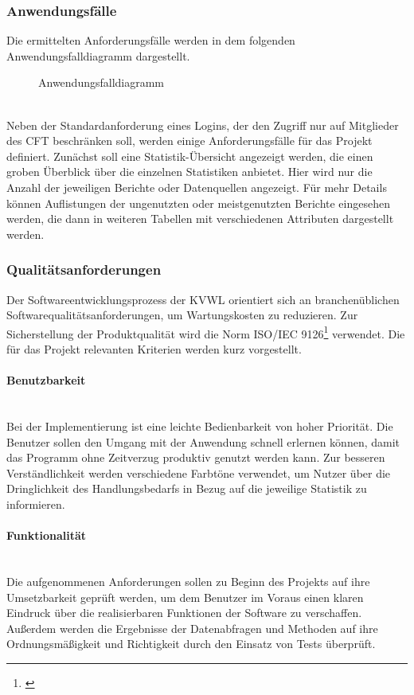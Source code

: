 \subsubsection{Anwendungsfälle}
\label{sec:Anwendungsfaelle}
Die ermittelten Anforderungsfälle werden in dem folgenden Anwendungsfalldiagramm dargestellt.
\begin{figure}[htb]
	\centering
	\caption{Anwendungsfalldiagramm}
	\label{fig:Anwendungsfalldiagramm}
\end{figure}\\
Neben der Standardanforderung eines Logins, der den Zugriff nur auf Mitglieder des \ac{CFT} \teamName beschränken soll, werden einige Anforderungsfälle für das Projekt definiert. Zunächst soll eine Statistik-Übersicht angezeigt werden, die einen groben Überblick über die einzelnen Statistiken anbietet. Hier wird nur die Anzahl der jeweiligen Berichte oder Datenquellen angezeigt. Für mehr Details können Auflistungen \zB der ungenutzten oder meistgenutzten Berichte eingesehen werden, die dann in weiteren Tabellen mit verschiedenen Attributen dargestellt werden.

\subsubsection{Qualitätsanforderungen}
\label{sec:Qualitaetsanforderungen}
Der Softwareentwicklungsprozess der \ac{KVWL} orientiert sich an branchenüblichen Softwarequalitätsanforderungen, um Wartungskosten zu reduzieren. Zur Sicherstellung der Produktqualität wird die Norm ISO/IEC 9126\footnote{\cite{ISO9126}} verwendet. Die für das Projekt relevanten Kriterien werden kurz vorgestellt.

\paragraph{Benutzbarkeit} ~\\
\label{p:Benutzbarkeit}
Bei der Implementierung ist eine leichte Bedienbarkeit von hoher Priorität. Die Benutzer sollen den Umgang mit der Anwendung schnell erlernen können, damit das Programm ohne Zeitverzug produktiv genutzt werden kann. Zur besseren Verständlichkeit werden verschiedene Farbtöne verwendet, um Nutzer über die Dringlichkeit des Handlungsbedarfs in Bezug auf die jeweilige Statistik zu informieren.

\paragraph{Funktionalität} ~\\
\label{p:Funktionalitaet}
Die aufgenommenen Anforderungen sollen zu Beginn des Projekts auf ihre Umsetzbarkeit geprüft werden, um dem Benutzer im Voraus einen klaren Eindruck über die realisierbaren Funktionen der Software zu verschaffen. Außerdem werden die Ergebnisse der Datenabfragen und Methoden auf ihre Ordnungsmäßigkeit und Richtigkeit durch den Einsatz von Tests überprüft.

